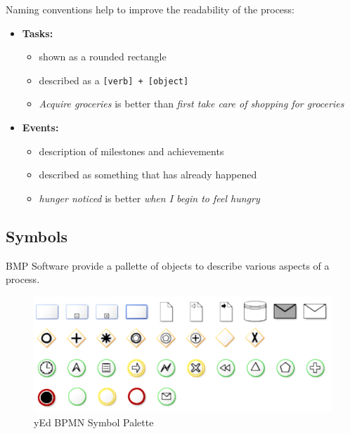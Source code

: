 \documentclass[]{book}
\providecommand{\tightlist}{%
  \setlength{\itemsep}{0pt}\setlength{\parskip}{0pt}}
\begin{document}
Naming conventions help to improve the readability of the process:

\begin{itemize}
\item
  \textbf{Tasks:}

  \begin{itemize}
  \tightlist
  \item
    shown as a rounded rectangle
  \item
    described as a \texttt{{[}verb{]}\ +\ {[}object{]}}
  \item
    \emph{Acquire groceries} is better than \emph{first take care of shopping for groceries}
  \end{itemize}
\item
  \textbf{Events:}

  \begin{itemize}
  \tightlist
  \item
    description of milestones and achievements
  \item
    described as something that has already happened
  \item
    \emph{hunger noticed} is better \emph{when I begin to feel hungry}
  \end{itemize}
\end{itemize}

\hypertarget{symbols}{%
\subsection{Symbols}\label{symbols}}

BMP Software provide a pallette of objects to describe various aspects of a process.

\begin{figure}
\centering
\includegraphics{images/yedpalette.png}
\caption{yEd BPMN Symbol Palette}
\end{figure}
\end{document}
